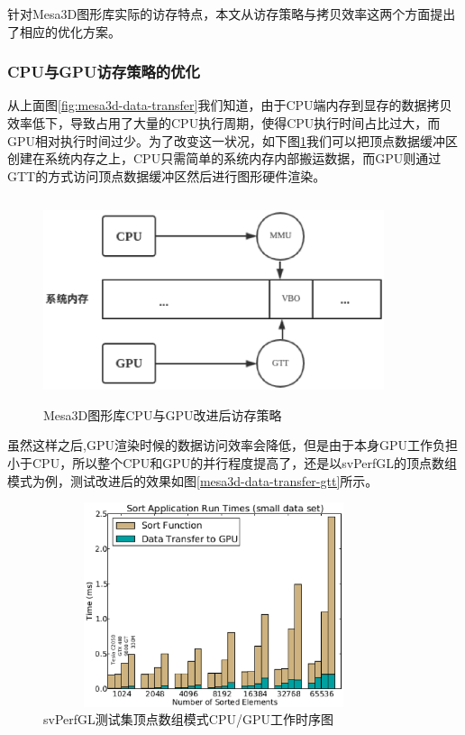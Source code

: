 针对Mesa3D图形库实际的访存特点，本文从访存策略与拷贝效率这两个方面提出了相应的优化方案。

\subsubsection{CPU与GPU访存策略的优化}
从上面图\ref{fig:mesa3d-data-transfer}我们知道，由于CPU端内存到显存的数据拷贝效率低下，导致占用了大量的CPU执行周期，使得CPU执行时间占比过大，而GPU相对执行时间过少。为了改变这一状况，如下图\ref{fig:vbo-gtt}我们可以把顶点数据缓冲区创建在系统内存之上，CPU只需简单的系统内存内部搬运数据，而GPU则通过GTT的方式访问顶点数据缓冲区然后进行图形硬件渲染。

\begin{figure}[H] 
  \centering
  \includegraphics[width=10cm,height=6cm]{figures/chap03/vbo-gtt}
  \caption{Mesa3D图形库CPU与GPU改进后访存策略}
  \label{fig:vbo-gtt}
\end{figure}

虽然这样之后,GPU渲染时候的数据访问效率会降低，但是由于本身GPU工作负担小于CPU，所以整个CPU和GPU的并行程度提高了，还是以svPerfGL的顶点数组模式为例，测试改进后的效果如图\ref{mesa3d-data-transfer-gtt}所示。

\begin{figure}[H] 
  \centering
  \includegraphics[width=10cm,height=6cm]{figures/chap03/mesa3d-data-transfer}
  \caption{svPerfGL测试集顶点数组模式CPU/GPU工作时序图}
  \label{fig:mesa3d-data-transfer-gtt}
\end{figure}

